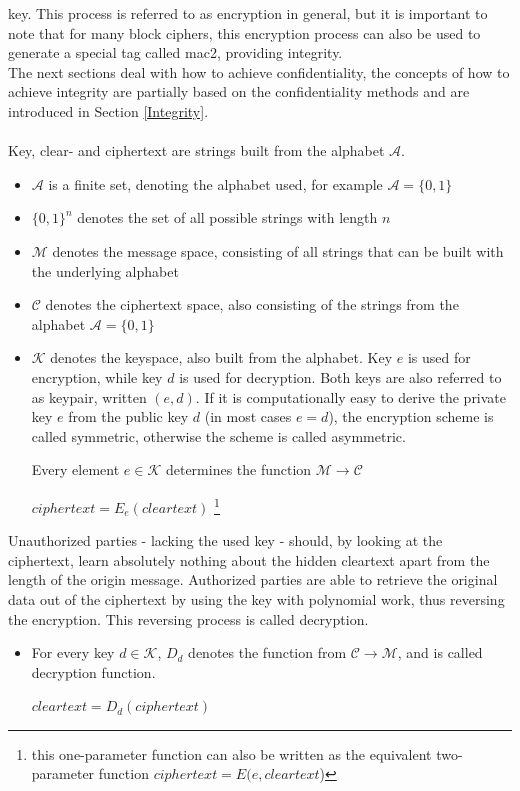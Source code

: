 key. This process is referred to as encryption in general, but it is important to note that for many block ciphers, this encryption process
can also be used to generate a special tag called \gls{mac2}, providing integrity.
\\
The next sections deal with how to achieve confidentiality, the 
concepts of how to achieve integrity are partially based on the confidentiality methods and are introduced in Section \ref{Integrity}.
\\
\\
Key, clear- and ciphertext are strings built from the alphabet $\mathcal{A}$. 
\begin{itemize}
 \item $\mathcal{A}$ is a finite set, denoting the alphabet used, for example
 $\mathcal{A} = \{0, 1\}$
 \item $\{0, 1\}^n$ denotes the set of all possible strings with length $n$
 \item $\mathcal{M}$ denotes the message space, consisting of all strings that can be built with the 
 underlying alphabet
 \item $\mathcal{C}$ denotes the ciphertext space, also consisting of the strings from 
 the alphabet
$\mathcal{A} = \{0, 1\}$
\item $\mathcal{K}$ denotes the keyspace, also built from the alphabet. Key $e$ is used for encryption, while key $d$ is used for decryption.
Both keys are also referred to as keypair, written $(e,d)$. 
If it is computationally easy to derive the private key $e$ from the public key $d$ (in most cases $e = d$), the encryption scheme
is called symmetric, otherwise the scheme is called asymmetric.

Every element $e \in \mathcal{K}$ determines the function $\mathcal{M} \rightarrow \mathcal{C}$
  \begin{center}
 $ciphertext = E_e(cleartext)$ \footnote{this one-parameter function can also be written as the equivalent two-parameter function $ciphertext=E(e,cleartext$)}
  \end{center}
\end{itemize}
Unauthorized parties - lacking the used key - should, by looking at the ciphertext, learn
absolutely nothing about the hidden cleartext apart from the length of the origin message. Authorized parties are
able to retrieve the original data out of the ciphertext by using the key with polynomial work, thus reversing
the encryption. This reversing process is called decryption.
\begin{itemize}
 \item For every key $d \in \mathcal{K}$, $D_d$ denotes the function from $\mathcal{C} \rightarrow
  \mathcal{M}$, and is called decryption function.
  \begin{center}
  $cleartext  = D_d(ciphertext)$
    \end{center}
\end{itemize}
